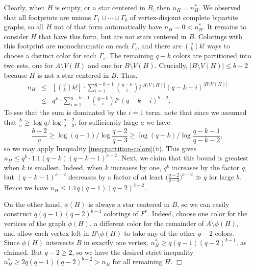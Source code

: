\documentclass[11pt]{article}
\begin{document}
Clearly, when $H$ is empty, or a star centered in $B$, then $n_H =
n_H^*$.  We observed that all footprints are unions $\Gamma_1 \cup
\cdots \cup \Gamma_k$ of vertex-disjoint complete bipartite graphs, so
all $H$ not of that form automatically have $n_H = 0 < n_H^*$.  It
remains to consider $H$ that have this form, but are not stars
centered in $B$.  Colorings with this footprint are monochromatic on
each $\Gamma_i$, and there are ${q \choose k} k!$ ways to choose a
distinct color for each $\Gamma_i$.  The remaining $q-k$ colors are
partitioned into two sets, one for $A \setminus V(H)$ and one for $B
\setminus V(H)$.  Crucially, $|B \setminus V(H)| \leq b-2$ because $H$ is
not a star centered in $B$.  Thus,
\begin{eqnarray*}
  n_H &\leq& \left[ {q \choose k} k! \right] \cdot 
  \sum_{i=1}^{q-k-1} {q-k \choose i} i^{|A \setminus V(H)|}
  (q-k-i)^{|B \setminus V(H)|}  \\
  &\leq&
  q^k \cdot \sum_{i=1}^{q-k-1} {q-k \choose i} i^a (q-k-i)^{b-2}.
\end{eqnarray*}
To see that the sum is dominated by the $i=1$ term, note that since we
assumed that $\frac{b}{a} \geq \log q / \log \frac{q-2}{q-3}$, for
sufficiently large $a$ we have 
\begin{displaymath}
  \frac{b-2}{a} \geq \log (q-1) / \log
  \frac{q-2}{q-3} \geq \log (q-k) / \log \frac{q-k-1}{q-k-2},
\end{displaymath}
so we may apply Inequality \ref{ineq:partition-colors}(ii).  This
gives $n_H \leq q^k \cdot 1.1 (q-k) (q-k-1)^{b-2}$.  Next, we claim
that this bound is greatest when $k$ is smallest.  Indeed, when $k$
increases by one, $q^k$ increases by the factor $q$, but
$(q-k-1)^{b-2}$ decreases by a factor of at least $\big(
\frac{q-2}{q-3} \big)^{b-2} \gg q$ for large $b$.  Hence we have $n_H
\leq 1.1 q (q-1) (q-2)^{b-2}$.

On the other hand, $\phi(H)$ is always a star centered in $B$, so we
can easily construct $q(q-1)(q-2)^{b-1}$ colorings of $F^*$.  Indeed,
choose one color for the vertices of the graph $\phi(H)$, a different
color for the remainder of $A \setminus \phi(H)$, and allow each
vertex left in $B \setminus \phi(H)$ to take any of the other $q-2$
colors.  Since $\phi(H)$ intersects $B$ in exactly one vertex, $n_H^*
\geq q(q-1)(q-2)^{b-1}$, as claimed.  But $q-2 \geq 2$, so we have the
desired strict inequality $n_H^* \geq 2 q(q-1) (q-2)^{b-2} > n_H$ for
all remaining $H$. \hfill $\Box$


\vspace{3mm}
\end{document}
